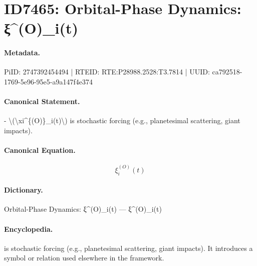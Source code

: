 \section*{ID7465: Orbital-Phase Dynamics: ξ\textasciicircum{}(O)\_i(t)}
\paragraph{Metadata.}
PiID: 2747392454494 | RTEID: RTE:P28988.2528:T3.7814 | UUID: ca792518-1769-5e96-95e5-a9a147f4e374

\paragraph{Canonical Statement.}
- \textbackslash{}(\textbackslash{}xi\textasciicircum{}\{(O)\}\_i(t)\textbackslash{}) is stochastic forcing (e.g., planetesimal scattering, giant impacts).

\paragraph{Canonical Equation.}
\[
\xi^{(O)}_i(t)
\]

\paragraph{Dictionary.}
Orbital-Phase Dynamics: ξ\textasciicircum{}(O)\_i(t) — ξ\textasciicircum{}(O)\_i(t)

\paragraph{Encyclopedia.}
is stochastic forcing (e.g., planetesimal scattering, giant impacts). It introduces a symbol or relation used elsewhere in the framework.
